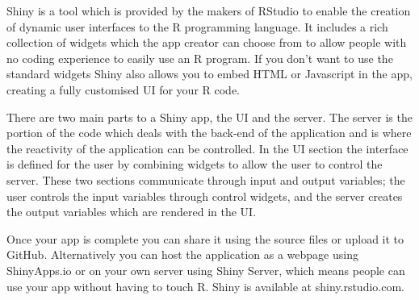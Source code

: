 Shiny is a tool which is provided by the makers of RStudio to enable the creation of dynamic user interfaces to the 
R programming language.  It includes a rich collection of widgets which the app creator can choose from to allow people
with no coding experience to easily use an R program.  If you don’t want to use the standard widgets 
Shiny also allows you to embed HTML or Javascript in the app, creating a fully customised UI for your R code.
 
 \newpage
There are two main parts to a Shiny app, the UI and the server.  
The server is the portion of the code which deals with the back-end of the application and is where the reactivity of 
the application can be controlled.  In the UI section the interface is defined for the user by combining widgets 
to allow the user to control the server.  These two sections communicate through input and output variables; the user 
controls the input variables through control widgets, and the server creates the output variables which are rendered in the UI.

 
Once your app is complete you can share it using the source files or upload it to GitHub.  
Alternatively you can host the application as a webpage using ShinyApps.io or on your own server using Shiny Server, 
which means people can use your app without having to touch R.  Shiny is available at shiny.rstudio.com.
